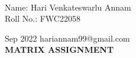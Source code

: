 \documentclass[10pt,a4paper]{report}
\begin{document}
 \vspace{3mm}\\ \raggedleft Name: Hari Venkateswarlu Annam\vspace{2mm}\\ \raggedleft Roll No.: FWC22058\vspace{2mm}\\ \raggedright Sep 2022 \hspace{12cm} \raggedleft hariannam99@gmail.com \vspace{10mm}
\\ \centering \Large \textbf{MATRIX ASSIGNMENT} \normalsize \vspace{15mm}
\end{document}
